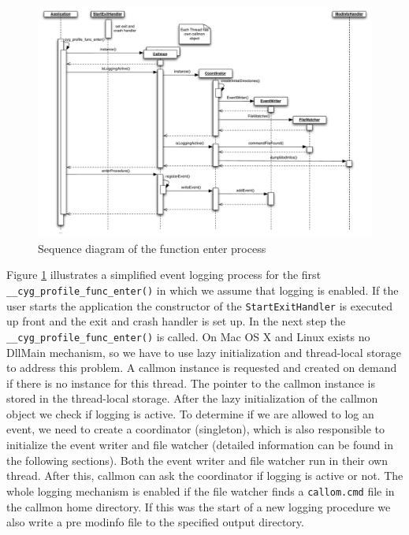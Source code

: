 \begin{figure}[ht]
\centering
\includegraphics[width=16cm]{images/callmon_sequence_diagram}
\caption{Sequence diagram of the function enter process}\label{fig:UNIXfe_figure2}
\end{figure}

Figure \ref{fig:UNIXfe_figure2} illustrates a simplified event logging process for the first \verb=__cyg_profile_func_enter()= in which we assume that logging is enabled. If the user starts the application the constructor of the \verb=StartExitHandler= is executed up front and the exit and crash handler is set up. In the next step the \verb=__cyg_profile_func_enter()= is called. On Mac OS X and Linux exists no DllMain mechanism, so we have to use lazy initialization and thread-local storage to address this problem. A callmon instance is requested and created on demand if there is no instance for this thread. The pointer to the callmon instance is stored in the thread-local storage. After the lazy	initialization of the callmon object we check if logging is active. To determine if we are allowed to log an event, we need to create a coordinator (singleton), which is also responsible to initialize the event writer and file watcher (detailed information can be found in the following sections). Both the event writer and file watcher run in their own thread. After this, callmon can ask the coordinator if logging is active or not. The whole logging mechanism is enabled if the file watcher finds a \verb=callom.cmd= file in the callmon home directory. If this was the start of a new logging procedure we also write a pre modinfo file to the specified output directory.

